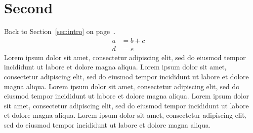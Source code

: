 \documentclass{article}
\begin{document}
\section{Second}\label{sec:second}
Back to Section~\ref{sec:intro} on page~\pageref{sec:intro}.
\begin{align} a&=b+c\\ d&=e \end{align}
Lorem ipsum dolor sit amet, consectetur adipiscing elit, sed do eiusmod tempor incididunt ut labore et dolore magna aliqua. Lorem ipsum dolor sit amet, consectetur adipiscing elit, sed do eiusmod tempor incididunt ut labore et dolore magna aliqua. Lorem ipsum dolor sit amet, consectetur adipiscing elit, sed do eiusmod tempor incididunt ut labore et dolore magna aliqua. Lorem ipsum dolor sit amet, consectetur adipiscing elit, sed do eiusmod tempor incididunt ut labore et dolore magna aliqua. Lorem ipsum dolor sit amet, consectetur adipiscing elit, sed do eiusmod tempor incididunt ut labore et dolore magna aliqua. 
\end{document}
